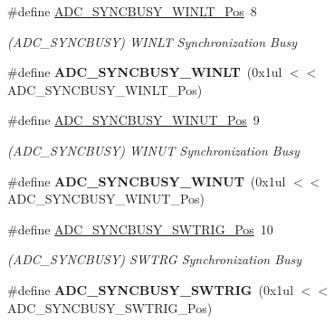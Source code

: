\begin{DoxyCompactItemize}
\item 
\hypertarget{group___s_a_m_l21___a_d_c_ga5cfecaf1885baf8811066f15033c5de7}{}\#define \hyperlink{group___s_a_m_l21___a_d_c_ga5cfecaf1885baf8811066f15033c5de7}{A\+D\+C\+\_\+\+S\+Y\+N\+C\+B\+U\+S\+Y\+\_\+\+W\+I\+N\+L\+T\+\_\+\+Pos}~8\label{group___s_a_m_l21___a_d_c_ga5cfecaf1885baf8811066f15033c5de7}

\begin{DoxyCompactList}\small\item\em (A\+D\+C\+\_\+\+S\+Y\+N\+C\+B\+U\+S\+Y) W\+I\+N\+L\+T Synchronization Busy \end{DoxyCompactList}\item 
\hypertarget{group___s_a_m_l21___a_d_c_gace15ffe776497d163b84921d397b4f1e}{}\#define {\bfseries A\+D\+C\+\_\+\+S\+Y\+N\+C\+B\+U\+S\+Y\+\_\+\+W\+I\+N\+L\+T}~(0x1ul $<$$<$ A\+D\+C\+\_\+\+S\+Y\+N\+C\+B\+U\+S\+Y\+\_\+\+W\+I\+N\+L\+T\+\_\+\+Pos)\label{group___s_a_m_l21___a_d_c_gace15ffe776497d163b84921d397b4f1e}

\item 
\hypertarget{group___s_a_m_l21___a_d_c_ga2e2c4deff72ea7179fd53d134e79c5c4}{}\#define \hyperlink{group___s_a_m_l21___a_d_c_ga2e2c4deff72ea7179fd53d134e79c5c4}{A\+D\+C\+\_\+\+S\+Y\+N\+C\+B\+U\+S\+Y\+\_\+\+W\+I\+N\+U\+T\+\_\+\+Pos}~9\label{group___s_a_m_l21___a_d_c_ga2e2c4deff72ea7179fd53d134e79c5c4}

\begin{DoxyCompactList}\small\item\em (A\+D\+C\+\_\+\+S\+Y\+N\+C\+B\+U\+S\+Y) W\+I\+N\+U\+T Synchronization Busy \end{DoxyCompactList}\item 
\hypertarget{group___s_a_m_l21___a_d_c_ga43f5e61479f6a099848dbac7058a8df2}{}\#define {\bfseries A\+D\+C\+\_\+\+S\+Y\+N\+C\+B\+U\+S\+Y\+\_\+\+W\+I\+N\+U\+T}~(0x1ul $<$$<$ A\+D\+C\+\_\+\+S\+Y\+N\+C\+B\+U\+S\+Y\+\_\+\+W\+I\+N\+U\+T\+\_\+\+Pos)\label{group___s_a_m_l21___a_d_c_ga43f5e61479f6a099848dbac7058a8df2}

\item 
\hypertarget{group___s_a_m_l21___a_d_c_ga96ff7ac5786798c905ef5c05943b04a5}{}\#define \hyperlink{group___s_a_m_l21___a_d_c_ga96ff7ac5786798c905ef5c05943b04a5}{A\+D\+C\+\_\+\+S\+Y\+N\+C\+B\+U\+S\+Y\+\_\+\+S\+W\+T\+R\+I\+G\+\_\+\+Pos}~10\label{group___s_a_m_l21___a_d_c_ga96ff7ac5786798c905ef5c05943b04a5}

\begin{DoxyCompactList}\small\item\em (A\+D\+C\+\_\+\+S\+Y\+N\+C\+B\+U\+S\+Y) S\+W\+T\+R\+G Synchronization Busy \end{DoxyCompactList}\item 
\hypertarget{group___s_a_m_l21___a_d_c_ga200cd2d3891182ad7126ff4425458cbc}{}\#define {\bfseries A\+D\+C\+\_\+\+S\+Y\+N\+C\+B\+U\+S\+Y\+\_\+\+S\+W\+T\+R\+I\+G}~(0x1ul $<$$<$ A\+D\+C\+\_\+\+S\+Y\+N\+C\+B\+U\+S\+Y\+\_\+\+S\+W\+T\+R\+I\+G\+\_\+\+Pos)\label{group___s_a_m_l21___a_d_c_ga200cd2d3891182ad7126ff4425458cbc}


\end{DoxyCompactItemize}
